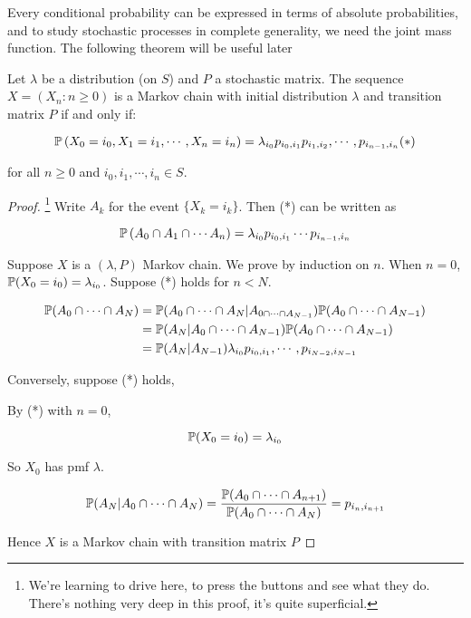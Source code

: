 \documentclass[a4paper]{article}
\begin{document}
Every conditional probability can be expressed in terms of absolute probabilities, and to study stochastic processes in complete generality, we need the joint mass function. The following theorem will be useful later

\begin{thm} 
	Let $ \lambda $ be a distribution (on $ S $) and $ P $ a stochastic matrix. The sequence $ X = (X_{n} : n \geq 0) $ is a Markov chain with initial distribution $ \lambda $ and transition matrix $ P $ if and only if:
	
	\[ \P\left(  X_{0} = i_{0}, X_{1} = i_{1}, \cdots, X_{n} = i_{n} \right) = \lambda_{i_{0}}p_{i_{0},i_{1}}p_{i_{1},i_{2}},\cdots,p_{i_{n-1},i_{n}} (*) \]
	
	for all $ n \geq 0 $ and $ i_{0},i_{1},\cdots,i_{n} \in S$.
\end{thm}


\begin{proof} \footnote{We're learning to drive here, to press the buttons and see what they do. There's nothing very deep in this proof, it's quite superficial.}
	Write  $ A_{k} $ for the event $ \{ X_{k} = i_{k} \} $. Then (*) can be written as 
	
	\[ \P\left(  A_{0} \cap A_{1} \cap \cdots A_{n} \right) = \lambda_{i_{0}} p_{i_{0},i_{1}} \cdots p_{i_{n-1},i_{n}}  \]
	
	
	Suppose $ X $ is a $ (\lambda,P) $ Markov chain. We prove by induction on $ n $. When $ n = 0 $, $ \P(X_{0} = i_{0}) = \lambda_{i_{0}} $.
	Suppose (*) holds for $ n < N $.
	
	\begin{align*}
	\P(A_{0} \cap \cdots \cap A_{N})& = \P(A_{0} \cap \cdots \cap A_{N}| A_{0 \cap \cdots \cap A_{N-1}}) \P(A_{0}\cap \cdots \cap A_{N-1}) \\
	& = \P(A_{N} | A_{0} \cap \cdots \cap A_{N-1}) \P(A_{0}\cap \cdots \cap A_{N-1})\\
	& =  \P(A_{N} | A_{N-1}) \lambda_{i_{0}} p_{i_{0},i_{1}},\cdots,p_{i_{N-2},i_{N-1}}
 	\end{align*}
 	
 	
 	
 	Conversely, suppose (*) holds, 
 	
 	By (*) with $ n = 0 $,
 	
 	\[ \P (X_{0} = i_{0}) = \lambda_{i_{0}} \]
 	
 	So $ X_{0} $ has pmf $ \lambda $.
 	
 	\[ \P(A_{N} | A_{0} \cap \cdots \cap A_{N}) = \frac{\P(A_{0} \cap \cdots \cap A_{n+1})}{\P(A_{0} \cap \cdots \cap A_{N})} = p_{i_{n},i_{n+1}} \]
 	
 	Hence $ X $ is a Markov chain with transition matrix $ P $
 \end{proof}
\end{document}
